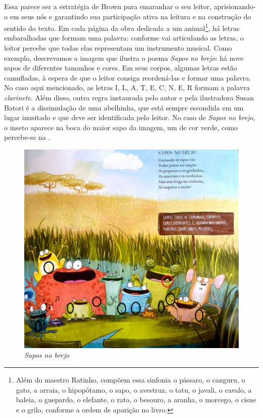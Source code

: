 \documentclass[portuguese]{textolivre}
\begin{document}
Essa parece ser a estratégia de Brown para emaranhar o seu leitor,
aprisionando-o em seus nós e garantindo sua participação ativa na leitura e na
construção do sentido do texto. Em cada página da obra dedicada a um
animal\footnote{Além do maestro Ratinho, compõem essa sinfonia o pássaro, o
canguru, o gato, a arraia, o hipopótamo, o sapo, o avestruz, o tatu, o javali,
o cavalo, a baleia, o guepardo, o elefante, o rato, o besouro, a aranha, o
morcego, o cisne e o grilo, conforme a ordem de aparição no livro.}, há letras
embaralhadas que formam uma palavra: conforme vai articulando as letras, o
leitor percebe que todas elas representam um instrumento musical. Como exemplo,
descrevamos a imagem que ilustra o poema \textit{Sapos no brejo}: há nove sapos de
diferentes tamanhos e cores. Em seus corpos, algumas letras estão camufladas, à
espera de que o leitor consiga reordená-las e formar uma palavra. No caso aqui
mencionado, as letras I, L, A, T, E, C, N, E, R formam a palavra
\textit{clarinete}. Além disso, outra regra instaurada pelo autor e pela
ilustradora Susan Batori é a dissimulação de uma abelhinha, que está sempre
escondida em um lugar inusitado e que deve ser identificada pelo leitor. No
caso de \textit{Sapos no brejo}, o inseto aparece na boca do maior sapo da imagem, um de
cor verde, como percebe-se na .

\begin{figure}[htbp]
  \centering
  \begin{minipage}{.65\textwidth}
    \includegraphics[width=\linewidth]{Fig3.jpeg}
    \caption{\textit{Sapos no brejo}}
    \label{fig3}
  \end{minipage}
\end{figure}
\end{document}
